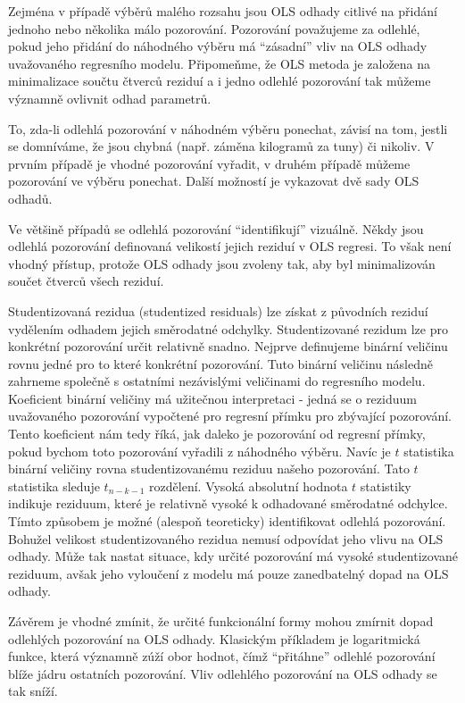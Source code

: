 Zejména v případě výběrů malého rozsahu jsou OLS odhady citlivé na přidání jednoho nebo několika málo pozorování. Pozorování považujeme za odlehlé, pokud jeho přidání do náhodného výběru má ``zásadní'' vliv na OLS odhady uvažovaného regresního modelu. Připomeňme, že OLS metoda je založena na minimalizace součtu čtverců reziduí a i jedno odlehlé pozorování tak můžeme významně ovlivnit odhad parametrů.

To, zda-li odlehlá pozorování v náhodném výběru ponechat, závisí na tom, jestli se domníváme, že jsou chybná (např. záměna kilogramů za tuny) či nikoliv. V prvním případě je vhodné pozorování vyřadit, v druhém případě můžeme pozorování ve výběru ponechat. Další možností je vykazovat dvě sady OLS odhadů.

Ve většině případů se odlehlá pozorování ``identifikují'' vizuálně. Někdy jsou odlehlá pozorování definovaná velikostí jejich reziduí v OLS regresi. To však není vhodný přístup, protože OLS odhady jsou zvoleny tak, aby byl minimalizován součet čtverců všech reziduí.

Studentizovaná rezidua (studentized residuals) lze získat z původních reziduí vydělením odhadem jejich směrodatné odchylky. Studentizované rezidum lze pro konkrétní pozorování určit relativně snadno. Nejprve definujeme binární veličinu rovnu jedné pro to které konkrétní pozorování. Tuto binární veličinu následně zahrneme společně s ostatními nezávislými veličinami do regresního modelu. Koeficient binární veličiny má užitečnou interpretaci - jedná se o reziduum uvažovaného pozorování vypočtené pro regresní přímku pro zbývající pozorování. Tento koeficient nám tedy říká, jak daleko je pozorování od regresní přímky, pokud bychom toto pozorování vyřadili z náhodného výběru. Navíc je $t$ statistika binární veličiny rovna studentizovanému reziduu našeho pozorování. Tato $t$ statistika sleduje $t_{n-k-1}$ rozdělení. Vysoká absolutní hodnota $t$ statistiky indikuje reziduum, které je relativně vysoké k odhadované směrodatné odchylce. Tímto způsobem je možné (alespoň teoreticky) identifikovat odlehlá pozorování. Bohužel velikost studentizovaného rezidua nemusí odpovídat jeho vlivu na OLS odhady. Může tak nastat situace, kdy určité pozorování má vysoké studentizované reziduum, avšak jeho vyloučení z modelu má pouze zanedbatelný dopad na OLS odhady.

Závěrem je vhodné zmínit, že určité funkcionální formy mohou zmírnit dopad odlehlých pozorování na OLS odhady. Klasickým příkladem je logaritmická funkce, která významně zúží obor hodnot, čímž ``přitáhne'' odlehlé pozorování blíže jádru ostatních pozorování. Vliv odlehlého pozorování na OLS odhady se tak sníží.

